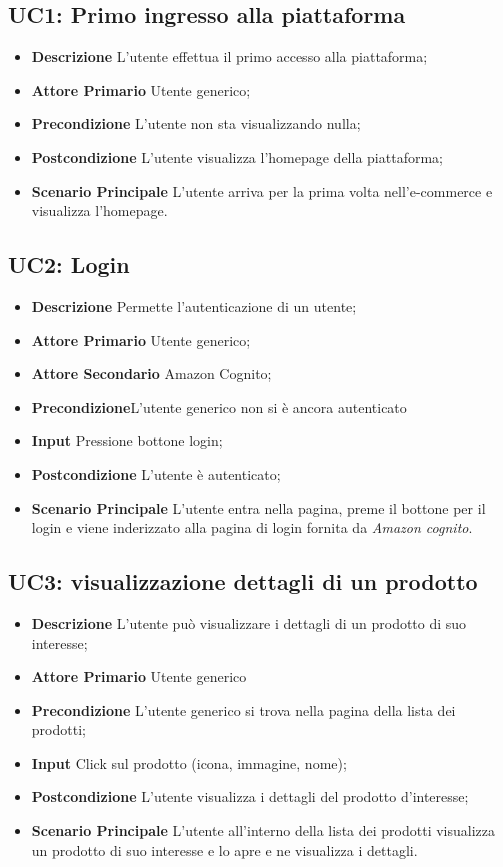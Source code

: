         \subsection{UC1: Primo ingresso alla piattaforma}
        \begin{itemize}
            \item \textbf{Descrizione} L'utente effettua il primo accesso alla piattaforma;
            \item \textbf{Attore Primario} Utente generico;
            \item \textbf{Precondizione} L'utente non sta visualizzando nulla;
            \item \textbf{Postcondizione} L'utente visualizza l'homepage della piattaforma;
            \item \textbf{Scenario Principale} L'utente arriva per la prima volta nell'e-commerce e visualizza l'homepage.
        \end{itemize}
        \subsection{UC2: Login}
        \begin{itemize}
            \item \textbf{Descrizione} Permette l'autenticazione di un utente;
            \item \textbf{Attore Primario} Utente generico;
            \item \textbf{Attore Secondario} Amazon Cognito;
            \item \textbf{Precondizione}L'utente generico non si è ancora autenticato
            \item \textbf{Input} Pressione bottone login;
            \item \textbf{Postcondizione} L'utente è autenticato;
            \item \textbf{Scenario Principale} L'utente entra nella pagina, preme il bottone per il login e viene inderizzato alla pagina di login fornita da \textit{Amazon cognito}.
        \end{itemize}
        \subsection{UC3: visualizzazione dettagli di un prodotto}
        \begin{itemize}
            \item \textbf{Descrizione} L'utente può visualizzare i dettagli di un prodotto di suo interesse;
            \item \textbf{Attore Primario} Utente generico
            \item \textbf{Precondizione} L'utente generico si trova nella pagina della lista dei prodotti;
            \item \textbf{Input} Click sul prodotto (icona, immagine, nome);
            \item \textbf{Postcondizione} L'utente visualizza i dettagli del prodotto d'interesse;
            \item \textbf{Scenario Principale} L'utente all'interno della lista dei prodotti visualizza un prodotto di suo interesse e lo apre e ne visualizza i dettagli.
        \end{itemize}
